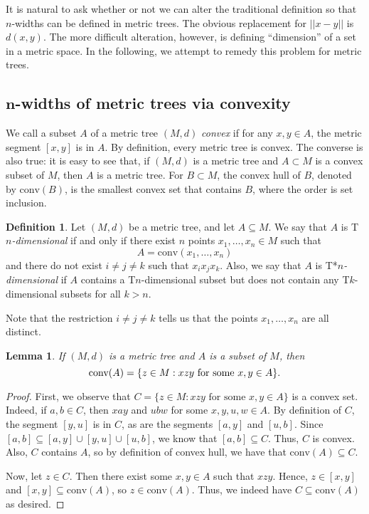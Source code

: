 \documentclass{bcp92}
\theoremstyle{plain}
\newtheorem{lem}[thm]{Lemma}
\theoremstyle{definition}
\newtheorem{defi}[thm]{Definition}
\begin{document}
It is natural to ask whether or not we can alter the traditional definition
so that $n$-widths can be defined in metric trees. The obvious replacement
for $||x-y||$ is $d(x,y)$. The more difficult alteration, however, is
defining ``dimension'' of a set in a metric space.  In the following, we
attempt to remedy this problem for metric trees.

\subsection {$\boldsymbol n$-widths of metric trees via convexity}
We call a subset $A$ of a metric tree $(M,d)$ \textit{convex} if for any $x,y
\in A$, the metric segment $[x,y]$ is in $A$.  By definition, every metric
tree is convex. The converse is also true: it is easy to see that, if
$(M,d)$ is a metric tree and $A \subset M$ is a convex subset of $M$, then
$A$ is a metric tree. For $B \subset M$, the convex hull of $B$, denoted
by $\text{conv}(B)$, is the smallest convex set that contains $B$, where the
order is set inclusion.

\begin{defi}
Let $(M,d)$ be a metric tree, and let $A \subseteq M$. We say that $A$ is
T\textit{$n$-dimensional\/} if and only if there exist $n$ points $x_1, \dots, x_n \in
M$ such that
$$
A = \text{conv}(x_1, \dots, x_{n})
$$
and there do not exist
$i \neq j \neq k$ such that $x_i x_j x_k$. Also, we say that $A$ is
T*\textit{$n$-dimensional\/} if $A$ contains a T$n$-dimensional subset but
does not contain any T$k$-dimensional subsets for all $k > n$.
\end{defi}

Note that the restriction $i \neq j \neq k$ tells us that the points
$x_1,\dots,x_n$ are all distinct.

\begin{lem} \label{convex-hull}
If $(M,d)$ is a metric tree and $A$ is a subset of $M$, then
$$
\text{\rm conv}(A) = \{ z \in M : xzy \text{ for some } x,y \in A \}.
$$
\end{lem}

\begin{proof}
First, we observe that $C = \{ z \in M : xzy \text{ for some } x,y \in A \}$
is a convex set. Indeed, if $a,b \in C$, then $xay$ and $ubw$ for some
$x,y,u,w \in A$. By definition of $C$, the segment $[y,u]$ is in $C$, as are
the segments $[a,y]$ and $[u,b]$. Since $[a,b] \subseteq [a,y] \cup [y,u]
\cup [u,b]$, we know that $[a,b] \subseteq C$. Thus, $C$ is convex. Also, $C$
contains $A$, so by definition of convex hull, we have that $\text{conv}(A)
\subseteq C$.

Now, let $z \in C$. Then there exist some $x,y \in A$ such that $xzy$. Hence,
$z \in [x,y]$ and $[x,y] \subseteq \text{conv}(A)$, so $z \in
\text{conv}(A)$. Thus, we indeed have $C \subseteq \text{conv}(A)$ as
desired.
\end{proof}
\end{document}
